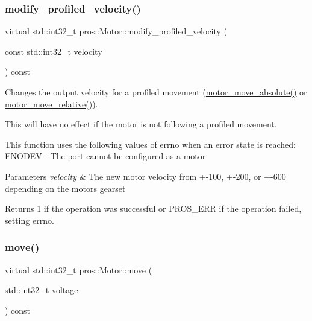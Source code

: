 \subsubsection{\texorpdfstring{modify\+\_\+profiled\+\_\+velocity()}{modify\_profiled\_velocity()}}
{\footnotesize\ttfamily virtual std\+::int32\+\_\+t pros\+::\+Motor\+::modify\+\_\+profiled\+\_\+velocity (\begin{DoxyParamCaption}\item[{const std\+::int32\+\_\+t}]{velocity }\end{DoxyParamCaption}) const\hspace{0.3cm}{\ttfamily [virtual]}}



Changes the output velocity for a profiled movement (\hyperlink{motors_8h_ab70bf4937f1b5cefa15c11c15314c90e}{motor\+\_\+move\+\_\+absolute()} or \hyperlink{motors_8h_ab4c1ba35d69e8e9b49df0e848fa305d3}{motor\+\_\+move\+\_\+relative()}). 

This will have no effect if the motor is not following a profiled movement.

This function uses the following values of errno when an error state is reached\+: E\+N\+O\+D\+EV -\/ The port cannot be configured as a motor


\begin{DoxyParams}{Parameters}
{\em velocity} & The new motor velocity from +-\/100, +-\/200, or +-\/600 depending on the motor\textquotesingle{}s gearset\\
\hline
\end{DoxyParams}
\begin{DoxyReturn}{Returns}
1 if the operation was successful or P\+R\+O\+S\+\_\+\+E\+RR if the operation failed, setting errno. 
\end{DoxyReturn}
\mbox{\label{classpros_1_1Motor_a7ea9aedd4e12844be2584dc3f4b7a4bf}} 
\subsubsection{\texorpdfstring{move()}{move()}}
{\footnotesize\ttfamily virtual std\+::int32\+\_\+t pros\+::\+Motor\+::move (\begin{DoxyParamCaption}\item[{std\+::int32\+\_\+t}]{voltage }\end{DoxyParamCaption}) const\hspace{0.3cm}{\ttfamily [virtual]}}



